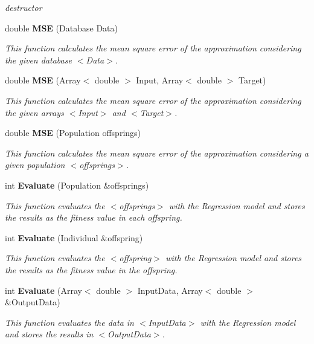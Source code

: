 \begin{CompactItemize}
\begin{CompactList}\small\item\em destructor \item\end{CompactList}\item 
double {\bf MSE} (Database Data)
\begin{CompactList}\small\item\em This function calculates the mean square error of the approximation considering the given database $<$Data$>$. \item\end{CompactList}\item 
double {\bf MSE} (Array$<$ double $>$ Input, Array$<$ double $>$ Target)
\begin{CompactList}\small\item\em This function calculates the mean square error of the approximation considering the given arrays $<$Input$>$ and $<$Target$>$. \item\end{CompactList}\item 
double {\bf MSE} (Population offsprings)
\begin{CompactList}\small\item\em This function calculates the mean square error of the approximation considering a given population $<$offsprings$>$. \item\end{CompactList}\item 
int {\bf Evaluate} (Population \&offsprings)
\begin{CompactList}\small\item\em This function evaluates the $<$offsprings$>$ with the Regression model and stores the results as the fitness value in each offspring. \item\end{CompactList}\item 
int {\bf Evaluate} (Individual \&offspring)
\begin{CompactList}\small\item\em This function evaluates the $<$offspring$>$ with the Regression model and stores the results as the fitness value in the offspring. \item\end{CompactList}\item 
int {\bf Evaluate} (Array$<$ double $>$ Input\-Data, Array$<$ double $>$ \&Output\-Data)
\begin{CompactList}\small\item\em This function evaluates the data in $<$Input\-Data$>$ with the Regression model and stores the results in $<$Output\-Data$>$. \item\end{CompactList}\item 

\end{CompactItemize}
